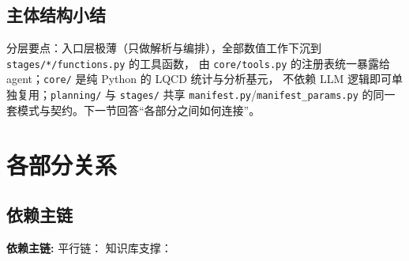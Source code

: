 \documentclass[UTF8]{ctexart}
\begin{document}
\subsection{主体结构小结}

\textcolor{struct}{分层要点}：入口层极薄（只做解析与编排），全部数值工作下沉到 \texttt{stages/*/functions.py} 的工具函数，
由 \texttt{core/tools.py} 的注册表统一暴露给 agent；\texttt{core/} 是纯 Python 的 LQCD 统计与分析基元，
不依赖 LLM 逻辑即可单独复用；\texttt{planning/} 与 \texttt{stages/} 共享 \texttt{manifest.py}/\texttt{manifest\_params.py}
的同一套模式与契约。下一节回答“各部分之间如何连接”。

\section{各部分关系}

\subsection{依赖主链}

\begin{keybox}
\textbf{依赖主链:} \textcolor{relation}{\texttt{}}
\qquad 平行链：\texttt{}
\qquad 知识库支撑：\texttt{}
\end{keybox}
\end{document}
